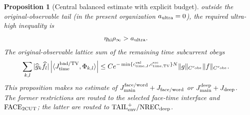 \documentclass[11pt]{article}
\newtheorem{proposition}[theorem]{Proposition}
\begin{document}
\begin{proposition}[Central balanced estimate with explicit budget]
outside the original-observable tail (in the present organization
$a_{\rm ultra}=0$), the required ultra-high inequality is
\begin{equation}
\label{eq:ultra-high-exponent-window}
 \eta_{\rm hi}\rho_\infty>a_{\rm ultra}.
\end{equation}
The original-observable lattice sum of the remaining time subcurrent obeys
\begin{equation}
\label{eq:time-clock-complete-lattice-bound}
 \sum_{k,l}|\widehat g_k\widehat f_l|
 \left|\langle J_{\rm time}^{\rm bad/TV},\Phi_{k,l}\rangle\right|
 \le C e^{-\min\{c_{\rm time,J}^{\rm val},
                     c_{\rm time,TV}^{\rm src}\}N}
       \|g\|_{C^{r_{\rm obs}}}\|f\|_{C^{r_{\rm obs}}}.
\end{equation}
This proposition makes no estimate of
$J_{\rm main}^{\rm face/word}+J_{\rm face/word}$ or
$J_{\rm main}^{\rm deep}+J_{\rm deep}$.  The former restrictions are routed
to the selected face-time interface and $\mathrm{FACE}_{\rm 2CUT}$; the
latter are routed to
$\mathrm{TAIL}_{\rm env}^{+}/\mathrm{NREC}_{\rm deep}$.
\end{proposition}
\end{document}
